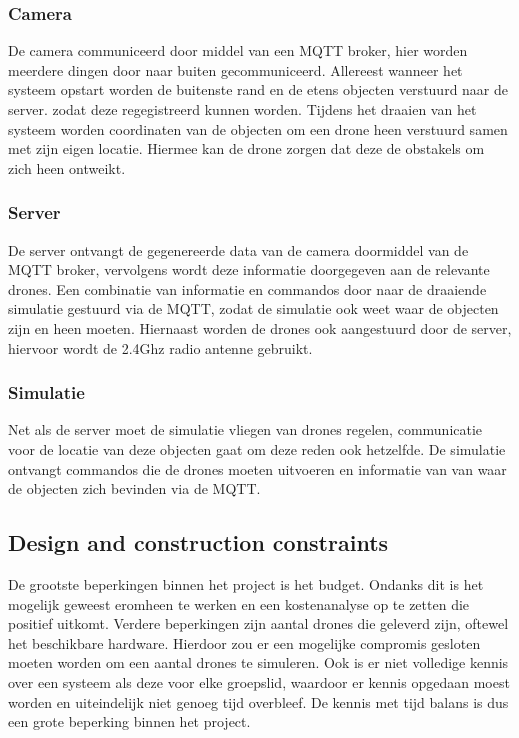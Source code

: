 \subsubsection*{Camera}
De camera communiceerd door middel van een MQTT broker, hier worden meerdere dingen door naar buiten gecommuniceerd.
Allereest wanneer het systeem opstart worden de buitenste rand en de etens objecten verstuurd naar de server. zodat deze regegistreerd kunnen worden.
Tijdens het draaien van het systeem worden coordinaten van de objecten om een drone heen verstuurd samen met zijn eigen locatie. 
Hiermee kan de drone zorgen dat deze de obstakels om zich heen ontweikt.

\subsubsection*{Server}
De server ontvangt de gegenereerde data van de camera doormiddel van de MQTT broker, vervolgens wordt deze informatie doorgegeven aan de relevante drones.
Een combinatie van informatie en commandos door naar de draaiende simulatie gestuurd via de MQTT, zodat de simulatie ook weet waar de objecten zijn en heen moeten.
Hiernaast worden de drones ook aangestuurd door de server, hiervoor wordt de 2.4Ghz radio antenne gebruikt.

\subsubsection*{Simulatie}
Net als de server moet de simulatie vliegen van drones regelen, communicatie voor de locatie van deze objecten gaat om deze reden ook hetzelfde.
De simulatie ontvangt commandos die de drones moeten uitvoeren  en informatie van van waar de objecten zich bevinden via de MQTT.


\subsection{Design and construction constraints}
De grootste beperkingen binnen het project is het budget. Ondanks dit is het mogelijk geweest eromheen te 
werken en een kostenanalyse op te zetten die positief uitkomt. Verdere beperkingen zijn aantal drones die geleverd zijn, 
oftewel het beschikbare hardware. Hierdoor zou er een mogelijke compromis gesloten moeten worden om een aantal drones 
te simuleren. Ook is er niet volledige kennis over een systeem als deze voor elke groepslid, 
waardoor er kennis opgedaan moest worden en uiteindelijk niet genoeg tijd overbleef. 
De kennis met tijd balans is dus een grote beperking binnen het project.
